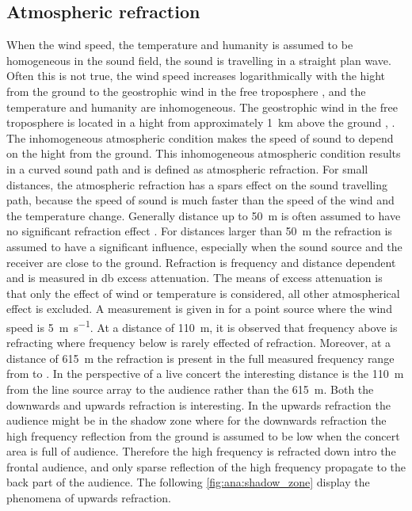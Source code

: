 \subsection{Atmospheric refraction} \label{sec:ana:atm_ref}
When the wind speed, the temperature and humanity is assumed to be homogeneous in the sound field, the sound is travelling in a straight plan wave. Often this is not true, the wind speed increases logarithmically with the hight from the ground to the geostrophic wind \citep{asmos_acous_2016} in the free troposphere \citep{spr_hand_book}, and the temperature and humanity are inhomogeneous. The geostrophic wind in the free troposphere is located in a hight from approximately \SI{1}{\kilo\meter} above the ground \citep{spr_hand_book}, \citep{geostrophic_wind}. The inhomogeneous atmospheric condition makes the speed of sound to depend on the hight from the ground. This inhomogeneous atmospheric condition results in a curved sound path and is defined as atmospheric refraction. For small distances, the atmospheric refraction has a spars effect on the sound travelling path, because the speed of sound is much faster than the speed of the wind and the temperature change. Generally distance up to \SI{50}{\meter} is often assumed to have no significant refraction effect \citep{effect_of_wind}. For distances larger than \SI{50}{\meter} the refraction is assumed to have a significant influence, especially when the sound source and the receiver are close to the ground. Refraction is frequency and distance dependent and is measured in \si{\decibel} excess attenuation. The means of excess attenuation is that only the effect of wind or temperature is considered, all other atmospherical effect is excluded. A measurement is given in \citep{review_of_sound} for a point source where the wind speed is \SI{5}{\meter\per\second}. At a distance of \SI{110}{\meter}, it is observed that frequency above  is refracting where frequency below is rarely effected of refraction. Moreover, at a distance of \SI{615}{\meter} the refraction is present in the full measured frequency range from  to . In the perspective of a live concert the interesting distance is the \SI{110}{\meter} from the line source array to the audience rather than the \SI{615}{\meter}. Both the downwards and upwards refraction is interesting. In the upwards refraction the audience might be in the shadow zone where for the downwards refraction the high frequency reflection from the ground is assumed to be low when the concert area is full of audience. Therefore the high frequency is refracted down intro the frontal audience, and only sparse reflection of the high frequency propagate to the back part of the audience. The following \autoref{fig:ana:shadow_zone} display the phenomena of upwards refraction.


